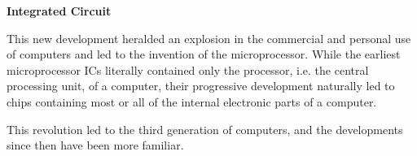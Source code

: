 \documentclass[12pt]{article}
\begin{document}
\vspace*{2em}
\noindent \textbf{Integrated Circuit}

This new development heralded an explosion in the commercial and personal use of computers and led to the invention of the microprocessor. While the earliest microprocessor ICs literally contained only the processor, i.e. the central processing unit, of a computer, their progressive development naturally led to chips containing most or all of the internal electronic parts of a computer.

This revolution led to the third generation of computers, and the developments since then have been more familiar. 

%
%
%
\end{document}
